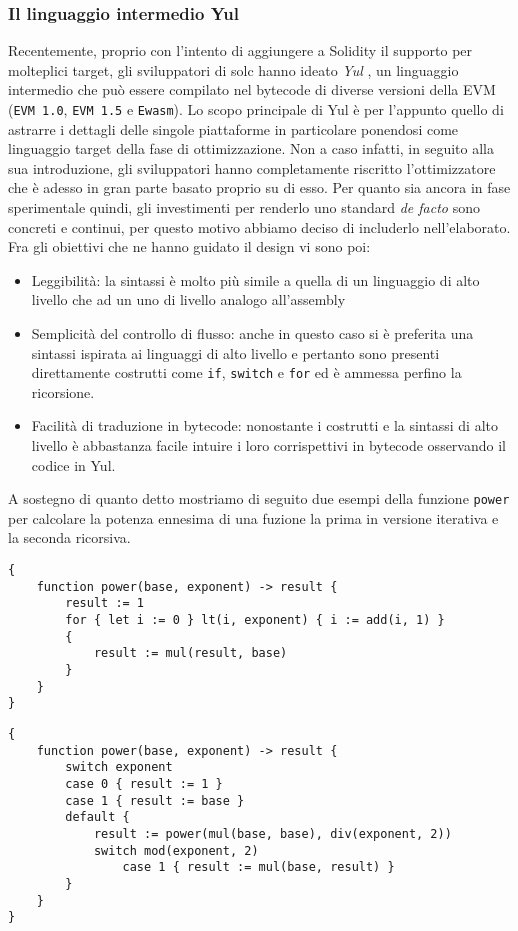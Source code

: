 \documentclass[12pt,a4paper,openright,oneside]{report}
\theoremstyle{definition}
\begin{document}
\subsubsection{Il linguaggio intermedio Yul}\label{impl:ov:solc:yul}
Recentemente, proprio con l'intento di aggiungere a Solidity il supporto per molteplici target, gli sviluppatori di solc hanno ideato \textit{Yul} \cite{yul}, un linguaggio intermedio che pu\`{o} essere compilato nel bytecode di diverse versioni della EVM (\texttt{EVM 1.0}, \texttt{EVM 1.5} e \texttt{Ewasm}). Lo scopo principale di Yul \`{e} per l'appunto quello di astrarre i dettagli delle singole piattaforme in particolare ponendosi come linguaggio target della fase di ottimizzazione. Non a caso infatti, in seguito alla sua introduzione, gli sviluppatori hanno completamente riscritto l'ottimizzatore che \`{e} adesso in gran parte basato proprio su di esso. Per quanto sia ancora in fase sperimentale quindi, gli investimenti per renderlo uno standard \textit{de facto} sono concreti e continui, per questo motivo abbiamo deciso di includerlo nell'elaborato. Fra gli obiettivi che ne hanno guidato il design vi sono poi:
\begin{itemize}
    \item Leggibilit\`{a}: la sintassi \`{e} molto pi\`{u} simile a quella di un linguaggio di alto livello che ad un uno di livello analogo all'assembly
    \item Semplicit\`{a} del controllo di flusso: anche in questo caso si \`{e} preferita una sintassi ispirata ai linguaggi di alto livello e pertanto sono presenti direttamente costrutti come \texttt{if}, \texttt{switch} e \texttt{for} ed \`{e} ammessa perfino la ricorsione.
    \item Facilit\`{a} di traduzione in bytecode: nonostante i costrutti e la sintassi di alto livello \`{e} abbastanza facile intuire i loro corrispettivi in bytecode osservando il codice in Yul.
\end{itemize}
A sostegno di quanto detto mostriamo di seguito due esempi della funzione \texttt{power} per calcolare la potenza ennesima di una fuzione la prima in versione iterativa e la seconda ricorsiva.
\begin{lstlisting}[language=Solidity,caption={Definizione iterativa della funzione \texttt{power} in Yul},frame=tlrb]
{
    function power(base, exponent) -> result {
        result := 1
        for { let i := 0 } lt(i, exponent) { i := add(i, 1) }
        {
            result := mul(result, base)
        }
    }
}
\end{lstlisting}
\begin{lstlisting}[language=Solidity,caption={Definizione ricorsiva della funzione \texttt{power} in Yul},frame=tlrb]
{
    function power(base, exponent) -> result {
        switch exponent
        case 0 { result := 1 }
        case 1 { result := base }
        default {
            result := power(mul(base, base), div(exponent, 2))
            switch mod(exponent, 2)
                case 1 { result := mul(base, result) }
        }
    }
}
\end{lstlisting}
\end{document}
